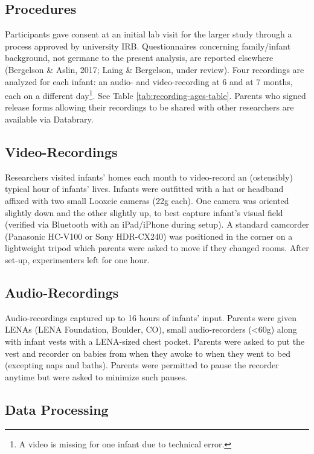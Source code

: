 \documentclass[man]{apa6}
\theoremstyle{definition}
\theoremstyle{definition}
\theoremstyle{definition}
\theoremstyle{remark}
\begin{document}
\subsection{Procedures}\label{procedures}

Participants gave consent at an initial lab visit for the larger study
through a process approved by university IRB. Questionnaires concerning
family/infant background, not germane to the present analysis, are
reported elsewhere (Bergelson \& Aslin, 2017; Laing \& Bergelson, under
review). Four recordings are analyzed for each infant: an audio- and
video-recording at 6 and at 7 months, each on a different
day\footnote{A video is missing for one infant due to technical error.}.
See Table \ref{tab:recording-ages-table}. Parents who signed release
forms allowing their recordings to be shared with other researchers are
available via Databrary.

\subsection{Video-Recordings}\label{video-recordings}

Researchers visited infants' homes each month to video-record an
(ostensibly) typical hour of infants' lives. Infants were outfitted with
a hat or headband affixed with two small Looxcie cameras (22g each). One
camera was oriented slightly down and the other slightly up, to best
capture infant's visual field (verified via Bluetooth with an
iPad/iPhone during setup). A standard camcorder (Panasonic HC-V100 or
Sony HDR-CX240) was positioned in the corner on a lightweight tripod
which parents were asked to move if they changed rooms. After set-up,
experimenters left for one hour.

\subsection{Audio-Recordings}\label{audio-recordings}

Audio-recordings captured up to 16 hours of infants' input. Parents were
given LENAs (LENA Foundation, Boulder, CO), small audio-recorders
(\textless{}60g) along with infant vests with a LENA-sized chest pocket.
Parents were asked to put the vest and recorder on babies from when they
awoke to when they went to bed (excepting naps and baths). Parents were
permitted to pause the recorder anytime but were asked to minimize such
pauses.

\subsection{Data Processing}\label{data-processing}
\end{document}
